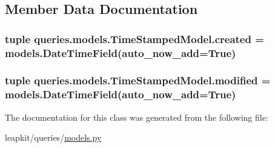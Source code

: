 \subsection{Member Data Documentation}
\hypertarget{classqueries_1_1models_1_1_time_stamped_model_a73c3e8e89a787e93ad219eb967d3da4c}{
\subsubsection[{created}]{\setlength{\rightskip}{0pt plus 5cm}tuple queries.\-models.\-Time\-Stamped\-Model.\-created = models.\-Date\-Time\-Field(auto\-\_\-now\-\_\-add=True)\hspace{0.3cm}{\ttfamily [static]}}}\label{classqueries_1_1models_1_1_time_stamped_model_a73c3e8e89a787e93ad219eb967d3da4c}
\hypertarget{classqueries_1_1models_1_1_time_stamped_model_a8508380cab20b34736996978b97d2802}{
\subsubsection[{modified}]{\setlength{\rightskip}{0pt plus 5cm}tuple queries.\-models.\-Time\-Stamped\-Model.\-modified = models.\-Date\-Time\-Field(auto\-\_\-now\-\_\-add=True)\hspace{0.3cm}{\ttfamily [static]}}}\label{classqueries_1_1models_1_1_time_stamped_model_a8508380cab20b34736996978b97d2802}


The documentation for this class was generated from the following file\-:\begin{DoxyCompactItemize}
\item 
leapkit/queries/\hyperlink{queries_2models_8py}{models.\-py}\end{DoxyCompactItemize}
